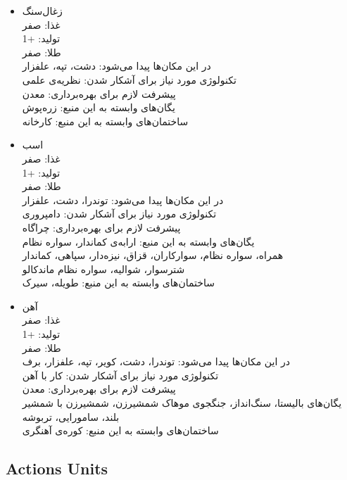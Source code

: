 \documentclass[]{article}
\begin{document}
\begin{itemize}
\item زغال‌سنگ\\
غذا: صفر\\
تولید‌: +1\\
طلا: صفر\\
در این مکان‌ها پیدا می‌شود: دشت، تپه، علفزار\\
تکنولوژی‌‌ مورد نیاز برای آشکار شدن: نظریه‌ی علمی\\
پیشرفت لازم برای بهره‌برداری: معدن\\
یگان‌های وابسته به این منبع: 	زره‌پوش\\
ساختمان‌های وابسته به این منبع: کارخانه\\

\item اسب\\
غذا: صفر\\
تولید‌: +1\\
طلا: صفر\\
در این مکان‌ها پیدا می‌شود: توندرا، دشت، علفزار\\
تکنولوژی‌‌ مورد نیاز برای آشکار شدن: دامپروری\\
پیشرفت لازم برای بهره‌برداری: چراگاه\\
یگان‌های وابسته به این منبع: 	ارابه‌ی کماندار، سواره نظام\\ همراه، سواره‌ نظام، سوارکاران، قزاق، نیزه‌دار، سپاهی، کماندار\\ شترسوار، شوالیه، سواره نظام ماندکالو\\ 
ساختمان‌های وابسته به این منبع: طویله، سیرک\\

\item آهن\\
غذا: صفر\\
تولید‌: +1\\
طلا: صفر\\
در این مکان‌ها پیدا می‌شود: توندرا، دشت، کویر،  تپه، علفزار، برف\\
تکنولوژی‌‌ مورد نیاز برای آشکار شدن: کار با آهن\\
پیشرفت لازم برای بهره‌برداری: معدن\\یگان‌های
بالیستا، سنگ‌انداز، جنگجوی موهاک شمشیرزن، شمشیرزن با شمشیر بلند، سامورایی، تربوشه\\
ساختمان‌های وابسته به این منبع: کوره‌ی آهنگری\\
\end{itemize}

\newpage
\subsection*{{\titr Actions Units}}
\end{document}
